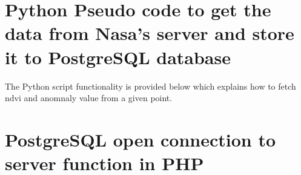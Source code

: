 \appendix
%
%

\chapter{Python Pseudo code to get the data from Nasa's server and store it to PostgreSQL database}\label{append:python_script_appendix}

The Python script functionality is provided below which explains how to fetch \gls{ndvi} and anomnaly value from a given point. 



\newpage

\chapter{PostgreSQL open connection to server function in PHP}\label{append:php_webservice}



\newpage


